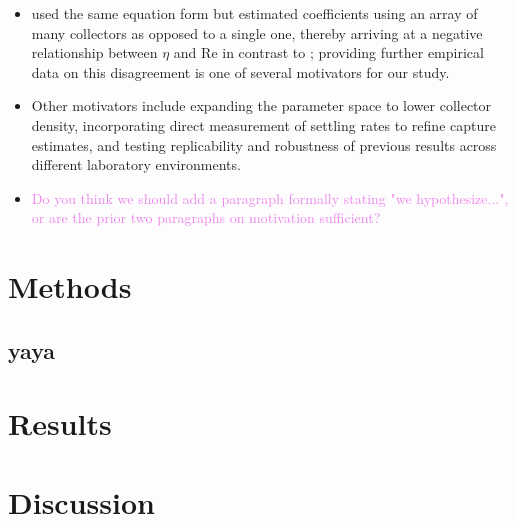 \documentclass{article}
\newcommand\Rey{\mathrm{Re}}
\begin{document}
\begin{itemize}
\item \cite{Fauria_2015} used the same equation form but estimated coefficients using an array of many collectors as opposed to a single one, thereby arriving at a negative relationship between $\eta$ and $\Rey$ in contrast to \cite{Palmer_2004}; providing further empirical data on this disagreement is one of several motivators for our study. 

\item Other motivators include expanding the parameter space to lower collector density, incorporating direct measurement of settling rates to refine capture estimates, and testing replicability and robustness of previous results across different laboratory environments.

\item \textcolor{violet}{Do you think we should add a paragraph formally stating "we hypothesize...", or are the prior two paragraphs on motivation sufficient?}

\end{itemize}

\section{Methods}

\subsection{yaya}

\section{Results}

\section{Discussion}



\end{document}
